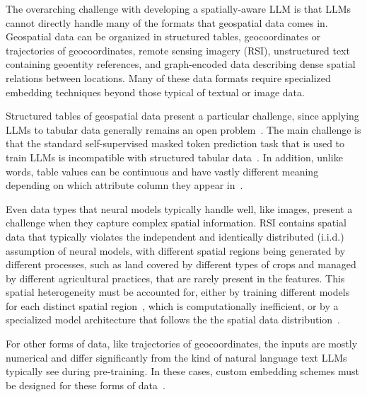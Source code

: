 The overarching challenge with developing a spatially-aware LLM is that LLMs cannot directly handle many of the formats that geospatial data comes in.
Geospatial data can be organized in structured tables, geocoordinates or trajectories of geocoordinates, remote sensing imagery (RSI), unstructured text containing geoentity references, and graph-encoded data describing dense spatial relations between locations.
%
Many of these data formats require specialized embedding techniques beyond those typical of textual or image data.


Structured tables of geospatial data present a particular challenge, since applying LLMs to tabular data generally remains an open problem~\cite{Gao2023,Cong2023}.
The main challenge is that the standard self-supervised masked token prediction task that is used to train LLMs is incompatible with structured tabular data~\cite{Tan2023, Qi2023}.
In addition, unlike words, table values can be continuous and have vastly different meaning depending on which attribute column they appear in~\cite{Qi2023}.


Even data types that neural models typically handle well, like images, present a challenge when they capture complex spatial information.
%
RSI contains spatial data that typically violates the independent and identically distributed (i.i.d.) assumption of neural models, with different spatial regions being generated by different processes, such as land covered by different types of crops and managed by different agricultural practices, that are rarely present in the features. 
This spatial heterogeneity must be accounted for, either by training different models for each distinct spatial region~\cite{Gupta2021}, which is computationally inefficient, or by a specialized model architecture that follows the the spatial data distribution~\cite{Xie2021b}.


For other forms of data, like trajectories of geocoordinates, the inputs are mostly numerical and differ significantly from the kind of natural language text LLMs typically see during pre-training.
In these cases, custom embedding schemes must be designed for these forms of data~\cite{Hu2023}.
%
%

